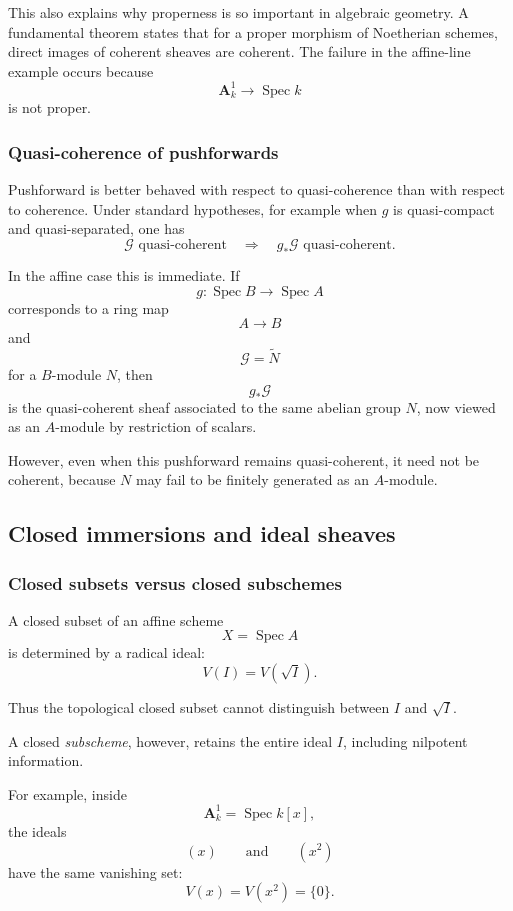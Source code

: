 This also explains why properness is so important in algebraic geometry. A fundamental theorem states that for a proper morphism of Noetherian schemes, direct images of coherent sheaves are coherent. The failure in the affine-line example occurs because
\[
\mathbf{A}^1_k\longrightarrow\operatorname{Spec} k
\]
is not proper.

\subsubsection{Quasi-coherence of pushforwards}

Pushforward is better behaved with respect to quasi-coherence than with respect to coherence. Under standard hypotheses, for example when \(g\) is quasi-compact and quasi-separated, one has
\[
\mathcal{G}\text{ quasi-coherent}
\quad\Longrightarrow\quad
g_*\mathcal{G}\text{ quasi-coherent}.
\]

In the affine case this is immediate. If
\[
g:\operatorname{Spec} B\longrightarrow\operatorname{Spec} A
\]
corresponds to a ring map
\[
A\longrightarrow B
\]
and
\[
\mathcal{G}=\widetilde{N}
\]
for a \(B\)-module \(N\), then
\[
g_*\mathcal{G}
\]
is the quasi-coherent sheaf associated to the same abelian group \(N\), now viewed as an \(A\)-module by restriction of scalars.

However, even when this pushforward remains quasi-coherent, it need not be coherent, because \(N\) may fail to be finitely generated as an \(A\)-module.

\subsection{Closed immersions and ideal sheaves}

\subsubsection{Closed subsets versus closed subschemes}

A closed subset of an affine scheme
\[
X=\operatorname{Spec} A
\]
is determined by a radical ideal:
\[
V(I)=V(\sqrt{I}).
\]

Thus the topological closed subset cannot distinguish between \(I\) and \(\sqrt I\).

A closed \emph{subscheme}, however, retains the entire ideal \(I\), including nilpotent information.

For example, inside
\[
\mathbf{A}^1_k=\operatorname{Spec} k[x],
\]
the ideals
\[
(x)
\qquad\text{and}\qquad
(x^2)
\]
have the same vanishing set:
\[
V(x)=V(x^2)=\{0\}.
\]

